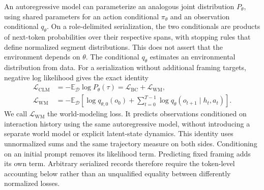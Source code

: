 \documentclass{article} %
\begin{document}
An autoregressive model can parameterize an analogous joint distribution $P_\theta$, using shared parameters for an action conditional $\pi_\theta$ and an observation conditional $q_\theta$. On a role-delimited serialization, the two conditionals are products of next-token probabilities over their respective spans, with stopping rules that define normalized segment distributions. This does not assert that the environment depends on $\theta$. The conditional $q_\theta$ estimates an environmental distribution from data. For a serialization without additional framing targets, negative log likelihood gives the exact identity
\begin{align}
 \mathcal L_{\mathrm{CLM}}
 &= -\mathbb E_{\mathcal D}\log P_\theta(\tau)
 =\mathcal L_{\mathrm{BC}}+\mathcal L_{\mathrm{WM}},\label{eq:decomposition}\\
 \mathcal L_{\mathrm{WM}}
 &= -\mathbb E_{\mathcal D}\left[\log q_{\theta,0}(o_0)
 +\sum_{t=0}^{T-1}\log q_\theta(o_{t+1}\mid h_t,a_t)\right].
\end{align}
We call $\mathcal L_{\mathrm{WM}}$ the world-modeling loss. It predicts observations conditioned on interaction history using the same autoregressive model, without introducing a separate world model or explicit latent-state dynamics. This identity uses unnormalized sums and the same trajectory measure on both sides. Conditioning on an initial prompt removes its likelihood term. Predicting fixed framing adds its own term. Arbitrary serialized records therefore require the token-level accounting below rather than an unqualified equality between differently normalized losses.
\end{document}
